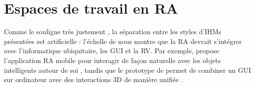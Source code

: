 \section{Espaces de travail en RA}
Comme le souligne très justement \cite{Billinghurst2015}, la séparation entre les styles d'IHMs présentées \cite{Rekimoto1995}  est artificielle : l'échelle de \cite{Milgram1994} nous montre que la RA devrait s'intégrer avec l'informatique ubiquitaire, les GUI et la RV. Par exemple, \cite{Heun2016} propose l'application RA mobile  pour interagir de façon naturelle avec les objets intelligents autour de soi , tandis que le prototype  de \cite{Lee2013} permet de combiner un GUI sur ordinateur avec des interactions 3D de manière unifiée .


